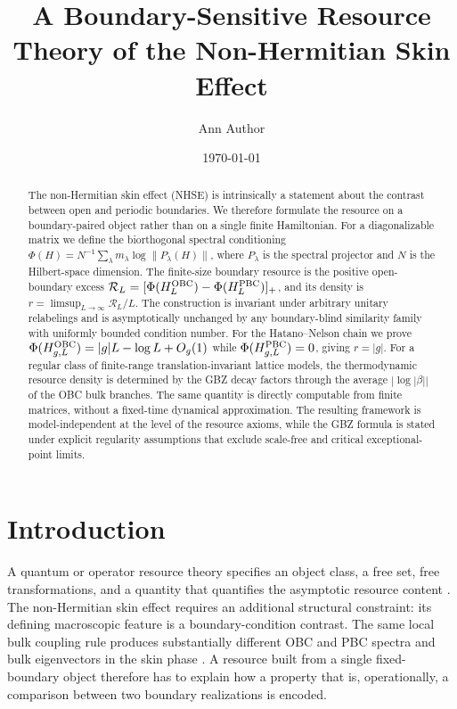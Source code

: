 \documentclass[reprint,amsmath,amssymb,aps,nofootinbib]{revtex4-2}
\begin{document}

\title{A Boundary-Sensitive Resource Theory of the Non-Hermitian Skin Effect}

\author{Ann Author}
\date{\today}

\begin{abstract}
The non-Hermitian skin effect (NHSE) is intrinsically a statement about the
contrast between open and periodic boundaries. We therefore formulate the
resource on a boundary-paired object rather than on a single finite
Hamiltonian. For a diagonalizable matrix we define the biorthogonal spectral
conditioning
\(\Phi(H)=N^{-1}\sum_\lambda m_\lambda\log\|P_\lambda(H)\|\),
where \(P_\lambda\) is the spectral projector and \(N\) is the Hilbert-space
dimension. The finite-size boundary resource is the positive open-boundary
excess
\(\mathcal R_L=[\Phi(H_L^{\rm OBC})-\Phi(H_L^{\rm PBC})]_+\),
and its density is \(r=\limsup_{L\to\infty}\mathcal R_L/L\).
The construction is invariant under arbitrary unitary relabelings and is
asymptotically unchanged by any boundary-blind similarity family with
uniformly bounded condition number. For the Hatano--Nelson chain we prove
\(\Phi(H_{g,L}^{\rm OBC})=|g|L-\log L+O_g(1)\) while
\(\Phi(H_{g,L}^{\rm PBC})=0\), giving
\(r=|g|\). For a regular class of finite-range translation-invariant
lattice models, the thermodynamic resource density is determined by the
GBZ decay factors through the average \(|\log|\beta||\) of the OBC bulk
branches. The same quantity is directly computable from finite matrices,
without a fixed-time dynamical approximation. The resulting framework is
model-independent at the level of the resource axioms, while the GBZ
formula is stated under explicit regularity assumptions that exclude
scale-free and critical exceptional-point limits.
\end{abstract}

\maketitle

\section{Introduction}
\label{sec:intro}

A quantum or operator resource theory specifies an object class, a free set,
free transformations, and a quantity that quantifies the asymptotic resource
content \cite{ChitambarGour,LiuYuan,ChiribellaSupermap}. The non-Hermitian skin
effect requires an additional structural constraint: its defining
macroscopic feature is a boundary-condition contrast. The same local bulk
coupling rule produces substantially different OBC and PBC spectra and bulk
eigenvectors in the skin phase \cite{HatanoNelson,YaoWang,OkumaEtAl2020}.
A resource built from a single fixed-boundary object therefore has to explain
how a property that is, operationally, a comparison between two boundary
realizations is encoded.
\end{document}
